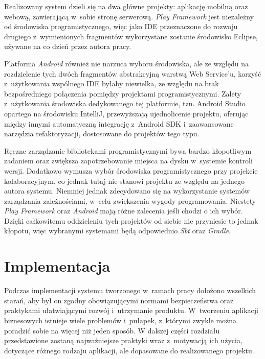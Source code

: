 \documentclass[11pt]{aghdpl}
\begin{document}
Realizowany system dzieli się na dwa główne projekty: aplikację mobilną oraz webową, zawierającą w~sobie stronę serwerową. \emph{Play Framework} jest niezależny od środowiska programistycznego, więc jako IDE przeznaczone do rozwoju drugiego z~wymienionych fragmentów wykorzystane zostanie środowisko Eclipse, używane na co dzień przez autora pracy.

Platforma \emph{Android} również nie narzuca wyboru środowiska, ale ze względu na rozdzielenie tych dwóch fragmentów abstrakcyjną warstwą Web Service'u, korzyść z~użytkowania wspólnego IDE byłaby niewielka, ze względu na brak bezpośredniego połączenia pomiędzy projektami programistycznymi. Zalety z~użytkowania środowiska dedykowanego tej platformie, tzn. Android Studio opartego na środowisku IntelliJ, przewyższają ujednolicenie projektu, oferując między innymi automatyczną integrację z~Android SDK i~zaawansowane narzędzia refaktoryzacji, dostosowane do projektów tego typu.

Ręczne zarządzanie bibliotekami programistycznymi bywa bardzo kłopotliwym zadaniem oraz zwiększa zapotrzebowanie miejsca na dysku w~systemie kontroli wersji. Dodatkowo wymusza wybór środowiska programistycznego przy projekcie kolaboracyjnym, co jednak tutaj nie stanowi projektu ze względu na jednego autora systemu. Niemniej jednak zdecydowano się na wykorzystanie systemów zarządzania zależnościami, w~celu zwiększenia wygody programowania. Niestety \emph{Play Framework} oraz \emph{Android} mają różne zalecenia jeśli chodzi o ich wybór. Dzięki całkowitemu oddzieleniu tych projektów od siebie nie przyniesie to jednak kłopotu, więc wybranymi systemami będą odpowiednio \emph{Sbt} oraz \emph{Gradle}.


\chapter{Implementacja}
\label{cha:implementacja}


Podczas implementacji systemu tworzonego w~ramach pracy dołożono wszelkich starań, aby był on zgodny obowiązującymi normami bezpieczeństwa oraz praktykami ułatwiającymi rozwój i~utrzymanie produktu. W~tworzeniu aplikacji biznesowych istnieje wiele problemów i~pułapek, z~którymi zwykle można poradzić sobie na więcej niż jeden sposób. W dalszej części rozdziału przedstawione zostaną najważniejsze praktyki wraz z~motywacją ich użycia, dotyczące różnego rodzaju aplikacji, ale dopasowane do realizowanego projektu.
\end{document}
